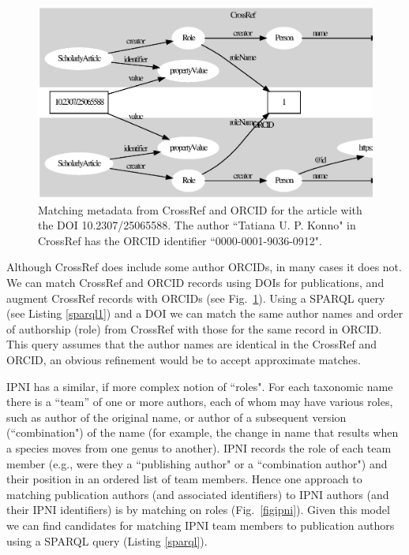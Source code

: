 \documentclass[runningheads]{llncs}
\begin{document}
\begin{figure}
\includegraphics[width=\textwidth]{author.eps}
\caption{Matching metadata from CrossRef and ORCID for the article with the DOI 10.2307/25065588. The author ``Tatiana U. P. Konno" in CrossRef has the ORCID identifier ``0000-0001-9036-0912".} \label{figauthor}
\end{figure}


Although CrossRef does include some author ORCIDs, in many cases it does not. We can match CrossRef and ORCID records using DOIs for publications, and augment CrossRef records with ORCIDs (see Fig.~\ref{figauthor}). Using a SPARQL query (see Listing \ref{sparql1}) and a DOI we can match the same author names and order of authorship (role) from CrossRef with those for the same record in ORCID. This query assumes that the author names are identical in the CrossRef and ORCID, an obvious refinement would be to accept approximate matches.


IPNI has a similar, if more complex notion of ``roles". For each taxonomic name there is a ``team” of one or more authors, each of whom may have various roles, such as author of the original name, or author of a subsequent version (``combination") of the name (for example, the change in name that results when a species moves from one genus to another). IPNI records the role of each team member (e.g., were they a ``publishing author" or a ``combination author") and their position in an ordered list of team members. Hence one approach to matching publication authors (and associated identifiers) to IPNI authors (and their IPNI identifiers) is by matching on roles (Fig.~\ref{figipni}). Given this model we can find candidates for matching IPNI team members to publication authors using a SPARQL query (Listing \ref{sparql}).
\end{document}
